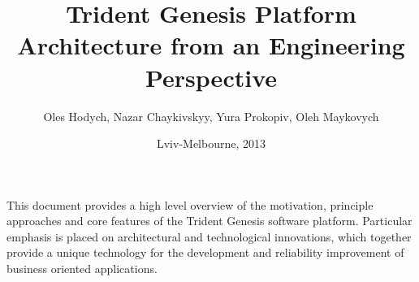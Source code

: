 \begin{titlepage}
\AddToShipoutPicture*{\BackgroundPic}
\title{Trident Genesis Platform Architecture from an Engineering Perspective}
\author{Oles Hodych, Nazar Chaykivskyy, Yura Prokopiv, Oleh Maykovych}
\date{Lviv-Melbourne, 2013}
\maketitle
\clearpage
\AddToShipoutPicture*{\BackgroundPic}
  This document provides a high level overview of the motivation, principle approaches and core features of the Trident Genesis software platform.
  Particular emphasis is placed on architectural and technological innovations, which together provide a unique technology for the development and reliability improvement of business oriented applications.

\clearpage
\AddToShipoutPicture*{\BackgroundPic}
\tableofcontents
\clearpage

\end{titlepage}